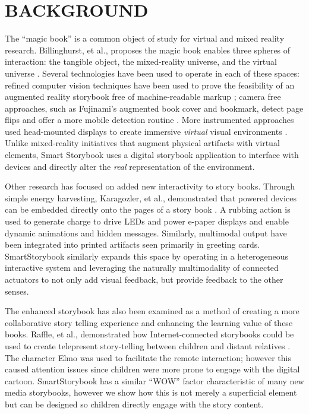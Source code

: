 \documentclass{sigchi}
\newcommand\namesp{SmartStorybook }
\begin{document}
\section{BACKGROUND}
The ``magic book'' is a common object of study for virtual and mixed reality research.
Billinghurst, et al., proposes the magic book enables three spheres of interaction: the tangible object, the mixed-reality universe, and the virtual universe \cite{billinghurst_magicbook-moving_2001}. Several technologies have been used to operate in each of these spaces: refined computer vision techniques have been used to prove the feasibility of an augmented reality storybook free of machine-readable markup \cite{scherrer_haunted_2008}; camera free approaches, such as Fujinami's augmented book cover and bookmark, detect page flips and offer a more mobile detection routine \cite{fujinami_page-flipping_2009}. More instrumented approaches used head-mounted displays to create immersive \textit{virtual} visual environments \cite{saso_little_2003}. Unlike mixed-reality initiatives that augment physical artifacts with virtual elements, Smart Storybook uses a digital storybook application to interface with devices and directly alter the \textit{real} representation of the environment.

Other research has focused on added new interactivity to story books. 
Through simple energy harvesting, Karagozler, et al., demonstrated that powered devices can be embedded directly onto the pages of a story book \cite{karagozler_paper_2013}. A rubbing action is used to generate charge to drive LEDs and power e-paper displays and enable dynamic animations and hidden messages. 
Similarly, multimodal output have been integrated into printed artifacts \cite{iggulden_printed_1999} seen primarily in greeting cards. \namesp similarly expands this space by operating in a heterogeneous interactive system and leveraging the naturally multimodality of connected actuators to not only add visual feedback, but provide feedback to the other senses.  

The enhanced storybook has also been examined as a method of creating a more collaborative story telling experience and enhancing the learning value of these books. Raffle, et al., demonstrated how Internet-connected storybooks could be used to create telepresent story-telling between children and distant relatives \cite{raffle_family_2010}. The character Elmo was used to facilitate the remote interaction; however this caused attention issues since children were more prone to engage with the digital cartoon. SmartStorybook has a similar ``WOW'' factor characteristic of many new media storybooks, however we show how this is not merely a superficial element but can be designed so children directly engage with the story content. 
\end{document}
